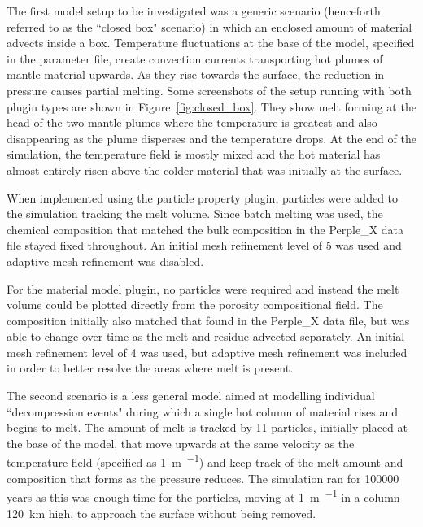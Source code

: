 \vspace{5mm}

The first model setup to be investigated was a generic scenario  (henceforth referred to as the ``closed box" scenario) in which an enclosed amount of material advects inside a box.
Temperature fluctuations at the base of the model, specified in the parameter file, create convection currents transporting hot plumes of mantle material upwards.
As they rise towards the surface, the reduction in pressure causes partial melting.
Some screenshots of the setup running with both plugin types are shown in Figure~\ref{fig:closed_box}.
They show melt forming at the head of the two mantle plumes where the temperature is greatest and also disappearing as the plume disperses and the temperature drops.
At the end of the simulation, the temperature field is mostly mixed and the hot material has almost entirely risen above the colder material that was initially at the surface.

When implemented using the particle property plugin, particles were added to the simulation tracking the melt volume.
Since batch melting was used, the chemical composition that matched the bulk composition in the Perple\_X data file stayed fixed throughout.
An initial mesh refinement level of 5 was used and adaptive mesh refinement was disabled.

For the material model plugin, no particles were required and instead the melt volume could be plotted directly from the porosity compositional field.
The composition initially also matched that found in the Perple\_X data file, but was able to change over time as the melt and residue advected separately.
An initial mesh refinement level of 4 was used, but adaptive mesh refinement was included in order to better resolve the areas where melt is present.

\vspace{5mm}

The second scenario is a less general model aimed at modelling individual ``decompression events" during which a single hot column of material rises and begins to melt.
The amount of melt is tracked by 11 particles, initially placed at the base of the model, that move upwards at the same velocity as the temperature field (specified as \SI{1}{\meter\per\year}) and keep track of the melt amount and composition that forms as the pressure reduces. 
The simulation ran for \num{100000} years as this was enough time for the particles, moving at \SI{1}{\meter\per\year} in a column \SI{120}{\km} high, to approach the surface without being removed.

